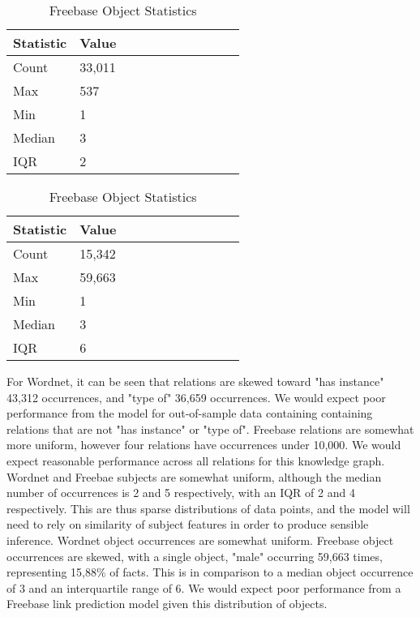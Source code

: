\begin{table}[H]
	\parbox{.5\linewidth}{
		\caption{Wordnet Object Statistics}
		\centering
		\begin{tabular}{lllllllllll}
  			\textbf{Statistic} & \textbf{Value}  \\
  			\hline
			Count & 33,011 \\
			Max & 537 \\
			Min & 1 \\
  			Median & 3 \\
  			IQR & 2 \\
		\end{tabular}
		}
	\hfill
	\parbox{.5\linewidth}{
		\caption{Freebase Object Statistics}
		\centering
		\begin{tabular}{lllllllllll}
  			\textbf{Statistic} & \textbf{Value}  \\
  			\hline
			Count & 15,342 \\
			Max & 59,663 \\
			Min & 1 \\
  			Median & 3 \\
  			IQR & 6 \\
		\end{tabular}
		}
\end{table}

For Wordnet, it can be seen that relations are skewed toward "has instance" 43,312 occurrences, and "type of" 36,659 occurrences. We would expect poor performance from the model for out-of-sample data containing
containing relations that are not "has instance" or "type of". Freebase relations are somewhat more uniform, however four relations have occurrences under 10,000. We would expect reasonable performance across all relations for this knowledge graph. \newline
Wordnet and Freebae subjects are somewhat uniform, although the median number of occurrences is 2 and 5 respectively, with an IQR of 2 and 4 respectively. This are thus sparse distributions of data points, and the model will need to rely on 
similarity of subject features in order to produce sensible inference. \newline
Wordnet object occurrences are somewhat uniform. Freebase object occurrences are skewed, with a single object, "male" occurring 59,663 times, representing 15,88\% of facts. This is in comparison to a median object occurrence of 3 and an interquartile range of 6.
We would expect poor performance from a Freebase link prediction model given this distribution of objects. \newline

